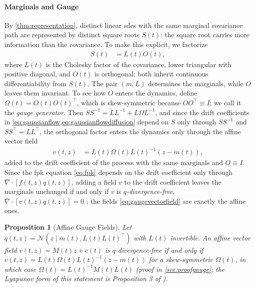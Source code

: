 \documentclass{article} %
\newcommand{\postdrift}{f}
\newcommand{\gauge}{\Omega}
\newcommand{\Norm}{\mathcal{N}}
\newtheorem{proposition}[theorem]{Proposition}
\begin{document}
\paragraph{Marginals and Gauge}
By \cref{thm:representation}, distinct linear \glspl{sde} with the same marginal covariance path are represented by distinct square roots $S(t)$: the square root carries more information than the covariance. To make this explicit, we factorize
\begin{align}
    S(t) &= L(t) O(t),
    \label{eq:factorization}
\end{align}
where $L(t)$ is the Cholesky factor of the covariance, lower triangular with positive diagonal, and $O(t)$ is orthogonal; both inherit continuous differentiability from $S(t)$. The pair $(m, L)$ determines the marginals, while $O$ leaves them invariant. To see how $O$ enters the dynamics, define $\gauge(t) = \dot O(t) O(t)^\top$, which is skew-symmetric because $O O^\top \equiv I$; we call it the \emph{gauge generator}. Then $\dot S S^{-1} = \dot L L^{-1} + L \gauge L^{-1}$, and since the drift coefficients in \cref{eq:gaussianflow,eq:gaussianflowdiffusion} depend on $S$ only through $\dot S S^{-1}$ and $S S^\top = L L^\top$, the orthogonal factor enters the dynamics only through the affine vector field
\begin{align}
    v(t, z) &= L(t) \gauge(t) L(t)^{-1} (z - m(t)),
    \label{eq:gaugevectorfield}
\end{align}
added to the drift coefficient of the process with the same marginals and $O \equiv I$. Since the \gls{fpk} equation \cref{eq:fpk} depends on the drift coefficient only through $\nabla \cdot [\postdrift(t, z) q(t, z)]$, adding a field $v$ to the drift coefficient leaves the marginals unchanged if and only if $v$ is \emph{$q$-divergence-free}, $\nabla \cdot [v(t, z) q(t, z)] = 0$ \citep{smith2026closing}; the fields \cref{eq:gaugevectorfield} are exactly the affine ones.
\begin{proposition}[Affine Gauge Fields]
\label{prop:gauge}
Let $q(t, z) = \Norm(z \mid m(t), L(t) L(t)^\top)$ with $L(t)$ invertible. An affine vector field $v(t, z) = M(t) z + c(t)$ is $q$-divergence-free if and only if $v(t, z) = L(t) \gauge(t) L(t)^{-1} (z - m(t))$ for a skew-symmetric $\gauge(t)$, in which case $\gauge(t) = L(t)^{-1} M(t) L(t)$ (proof in \cref{sec:proofgauge}; the Lyapunov form of this statement is Proposition 3 of \citealp{smith2026closing}).
\end{proposition}
\end{document}
